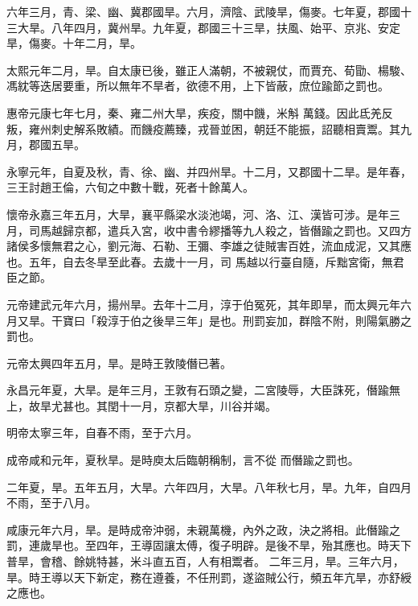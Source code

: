 \begin{pinyinscope}
 六年三月，青、梁、幽、冀郡國旱。六月，濟陰、武陵旱，傷麥。七年夏，郡國十三大旱。八年四月，冀州旱。九年夏，郡國三十三旱，扶風、始平、京兆、安定旱，傷麥。十年二月，旱。



 太熙元年二月，旱。自太康已後，雖正人滿朝，不被親仗，而賈充、荀勖、楊駿、馮紞等迭居要重，所以無年不旱者，欲德不用，上下皆蔽，庶位踰節之罰也。



 惠帝元康七年七月，秦、雍二州大旱，疾疫，關中饑，米斛
 萬錢。因此氐羌反叛，雍州刺史解系敗績。而饑疫薦臻，戎晉並困，朝廷不能振，詔聽相賣鬻。其九月，郡國五旱。



 永寧元年，自夏及秋，青、徐、幽、并四州旱。十二月，又郡國十二旱。是年春，三王討趙王倫，六旬之中數十戰，死者十餘萬人。



 懷帝永嘉三年五月，大旱，襄平縣梁水淡池竭，河、洛、江、漢皆可涉。是年三月，司馬越歸京都，遣兵入宮，收中書令繆播等九人殺之，皆僭踰之罰也。又四方諸侯多懷無君之心，劉元海、石勒、王彌、李雄之徒賊害百姓，流血成泥，又其應也。五年，自去冬旱至此春。去歲十一月，司
 馬越以行臺自隨，斥黜宮衛，無君臣之節。



 元帝建武元年六月，揚州旱。去年十二月，淳于伯冤死，其年即旱，而太興元年六月又旱。干寶曰「殺淳于伯之後旱三年」是也。刑罰妄加，群陰不附，則陽氣勝之罰也。



 元帝太興四年五月，旱。是時王敦陵僭已著。



 永昌元年夏，大旱。是年三月，王敦有石頭之變，二宮陵辱，大臣誅死，僭踰無上，故旱尤甚也。其閏十一月，京都大旱，川谷并竭。



 明帝太寧三年，自春不雨，至于六月。



 成帝咸和元年，夏秋旱。是時庾太后臨朝稱制，言不從
 而僭踰之罰也。



 二年夏，旱。五年五月，大旱。六年四月，大旱。八年秋七月，旱。九年，自四月不雨，至于八月。



 咸康元年六月，旱。是時成帝沖弱，未親萬機，內外之政，決之將相。此僭踰之罰，連歲旱也。至四年，王導固讓太傅，復子明辟。是後不旱，殆其應也。時天下普旱，會稽、餘姚特甚，米斗直五百，人有相鬻者。
 二年三月，旱。三年六月，旱。時王導以天下新定，務在遵養，不任刑罰，遂盜賊公行，頻五年亢旱，亦舒綬之應也。




\end{pinyinscope}
